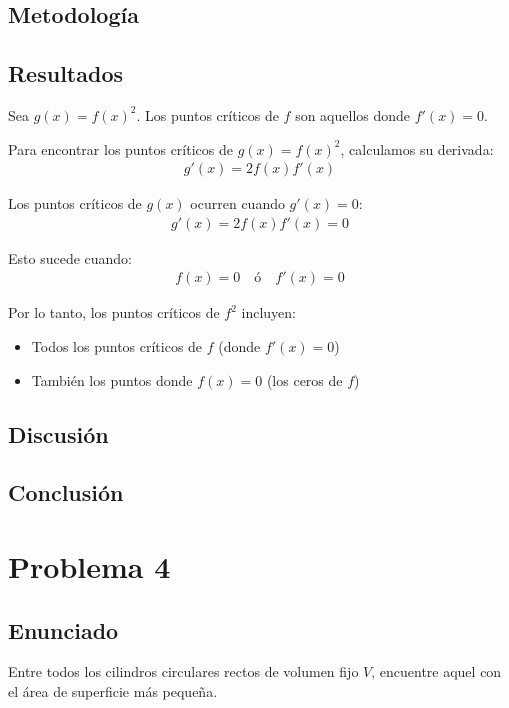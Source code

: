 \documentclass{article}
\begin{document}
\subsection{Metodología}

\subsection{Resultados}
\setcounter{equation}{0}
Sea $g(x) = f(x)^2$. Los puntos críticos de $f$ son aquellos donde $f'(x) = 0$.

Para encontrar los puntos críticos de $g(x) = f(x)^2$, calculamos su derivada:
\begin{align}
g'(x) = 2f(x)f'(x)
\end{align}

Los puntos críticos de $g(x)$ ocurren cuando $g'(x) = 0$:
\begin{align}
g'(x) = 2f(x)f'(x) = 0
\end{align}

Esto sucede cuando:
\begin{align}
f(x) = 0 \quad \text{ó} \quad f'(x) = 0
\end{align}

Por lo tanto, los puntos críticos de $f^2$ incluyen:
\begin{itemize}
    \item Todos los puntos críticos de $f$ (donde $f'(x) = 0$)
    \item También los puntos donde $f(x) = 0$ (los ceros de $f$)
\end{itemize}

\subsection{Discusión}

\subsection{Conclusión}

\section{Problema 4}

\subsection{Enunciado}
Entre todos los cilindros circulares rectos de volumen fijo $V$, encuentre aquel con el área de superficie más pequeña.
\end{document}
